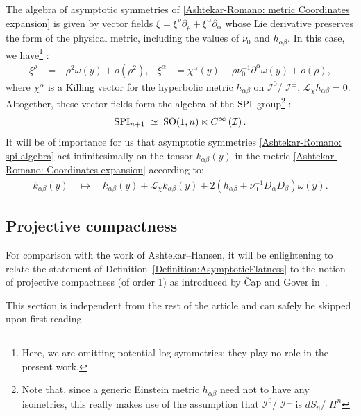 \documentclass[a4paper, 10pt]{article}
\theoremstyle{remark}
\newcommand{\correc}[1]{#1}
\newcommand{\SPI}{\textnormal{SPI}}%
\begin{document}
The algebra of asymptotic symmetries of \eqref{Ashtekar-Romano: metric Coordinates expansion} is given by vector fields $\xi = \xi^{\rho} \partial_{\rho} + \xi^{\alpha} \partial_{\alpha}$ whose Lie derivative preserves the form of the physical metric, including the values of $\nu_0$ and $h_{\alpha \beta}$. In this case, we have\footnote{Here, we are omitting potential log-symmetries; they play no role in the present work.} \cite{Ashtekar:1991vb,Compere:2023qoa}:
\begin{align}\label{Ashtekar-Romano: spi algebra}
    \xi^{\rho} &= -\rho^2 \omega(y) + o(\rho^2),  &
    \xi^{\alpha} &= \chi^{\alpha}(y) + \rho \nu_0^{-1}\partial^\alpha\omega(y) + o(\rho),
\end{align}
where $\chi^{\alpha}$ is a Killing vector for the hyperbolic metric $h_{\alpha \beta}$ on $\mathcal{I}^{0}$/ $\mathcal{I}^{\pm}$, $\mathcal{L}_{\chi}h_{\alpha \beta}=0$. Altogether, these vector fields form the algebra of the $\SPI$ group\footnote{Note that, since a generic Einstein metric $h_{\alpha\beta}$ need not to have any isometries, this really makes use of the assumption that $\mathcal{I}^{0}$/ $\mathcal{I}^{\pm}$ is $dS_n$/ $H^n$} \cite{Ashtekar:1991vb}:
\begin{equation}
    \SPI_{n+1} \;\simeq\; \textrm{SO}(1,n) \ltimes C^{\infty}\correc{\left(\mathcal{I}\right)}.
\end{equation}
It will be of importance for us that asymptotic symmetries \eqref{Ashtekar-Romano: spi algebra} act infinitesimally on the tensor $k_{\alpha\beta}(y)$ in the metric \eqref{Ashtekar-Romano: Coordinates expansion} according to:
%
\begin{align}\label{Ashtekar Romano: transformation of k}
    k_{\alpha \beta}(y) \quad\mapsto\quad k_{\alpha \beta}(y)  + \mathcal{L}_{\chi}k_{\alpha \beta}(y) + 2 \left( h_{\alpha \beta} + \nu_0^{-1} D_\alpha D_\beta \right)\omega(y).
\end{align}

\subsection{Projective compactness}\label{ssection:Projective compactness}

For comparison with the work of Ashtekar--Hansen, it will be enlightening to relate the statement of Definition~\ref{Definition:AsymptoticFlatness} to the notion of projective compactness (of order 1) as introduced by Čap and Gover in~\cite{Cap:2014ab}. 

This section is independent from the rest of the article and can safely be skipped upon first reading.
\end{document}
